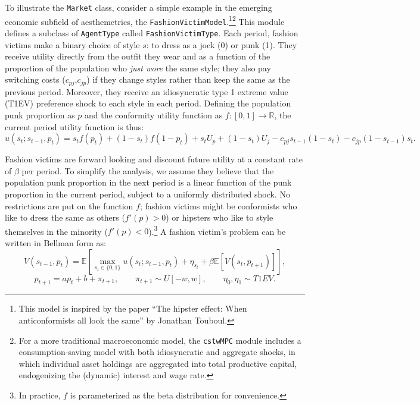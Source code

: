 \documentclass[12pt,titlepage,letterpaper]{econtex}
\newcommand{\E}{\mathbb{E}}
\begin{document}
To illustrate the \texttt{Market} class, consider a simple example in the emerging economic subfield of aesthemetrics, the \texttt{FashionVictimModel}.\footnote{This model is inspired by the paper ``The hipster effect: When anticonformists all look the same'' by Jonathan Touboul.}\footnote{For a more traditional macroeconomic model, the \texttt{cstwMPC} module includes a consumption-saving model with both idiosyncratic and aggregate shocks, in which individual asset holdings are aggregated into total productive capital, endogenizing the (dynamic) interest and wage rate.}  This module defines a subclass of \texttt{AgentType} called \texttt{FashionVictimType}.  Each period, fashion victims make a binary choice of style $s$: to dress as a jock (0) or punk (1).  They receive utility directly from the outfit they wear and as a function of the proportion of the population who \textit{just wore} the same style; they also pay switching costs ($c_{pj}$,$c_{jp}$) if they change styles rather than keep the same as the previous period.  Moreover, they receive an idiosyncratic type 1 extreme value (T1EV) preference shock to each style in each period.  Defining the population punk proportion as $p$ and the conformity utility function as $f:[0,1]\rightarrow \mathbb{R}$, the current period utility function is thus:
\begin{equation*}
u(s_t;s_{t-1},p_t) = s_t f(p_t) + (1-s_t) f(1-p_t) + s_t U_p + (1-s_t) U_j - c_{pj} s_{t-1}(1-s_t) - c_{jp}(1-s_{t-1})s_t.
\end{equation*}

Fashion victims are forward looking and discount future utility at a constant rate of $\beta$ per period.  To simplify the analysis, we assume they believe that the population punk proportion in the next period is a linear function of the punk proportion in the current period, subject to a uniformly distributed shock.  No restrictions are put on the function $f$; fashion victims might be conformists who like to dress the same as others ($f'(p) > 0$) or hipsters who like to style themselves in the minority ($f'(p) < 0$).\footnote{In practice, $f$ is parameterized as the beta distribution for convenience.}  A fashion victim's problem can be written in Bellman form as:
\begin{equation*}
V(s_{t-1},p_t) = \E \left[ \max_{s_t \in \{0,1\}} u(s_t;s_{t-1},p_t) + \eta_{s_t} + \beta \E \left[ V(s_t,p_{t+1}) \right] \right], 
\end{equation*}
\begin{equation*}
p_{t+1} = a p_t + b + \pi_{t+1}, \qquad \pi_{t+1} \sim U[-w,w], \qquad \eta_0,\eta_1 \sim T1EV.
\end{equation*}
\end{document}
